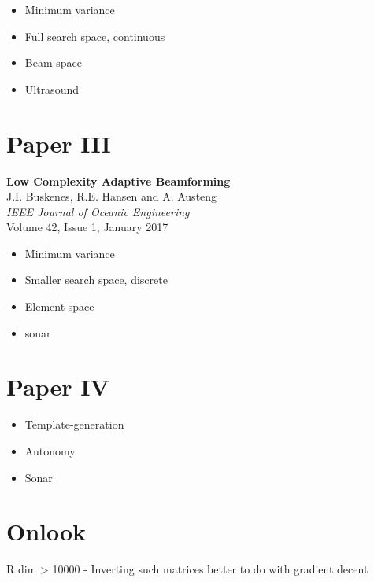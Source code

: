 \begin{itemize}
\item Minimum variance
\item Full search space, continuous
\item Beam-space
\item Ultrasound
\end{itemize}


\section{Paper III}\label{sec:paperIII} %
\textbf{Low Complexity Adaptive Beamforming}~\cite{Buskenes2014}\\
J.I. Buskenes, R.E. Hansen and A. Austeng\\
\textit{IEEE Journal of Oceanic Engineering}\\
Volume 42, Issue 1, January 2017

\begin{itemize}
\item Minimum variance
\item Smaller search space, discrete
\item Element-space
\item sonar
\end{itemize}



\section{Paper IV}\label{sec:paperIV} %

\begin{itemize}
\item Template-generation
\item Autonomy
\item Sonar
\end{itemize}



\section{Onlook}

R dim > 10000
- Inverting such matrices better to do with gradient decent


